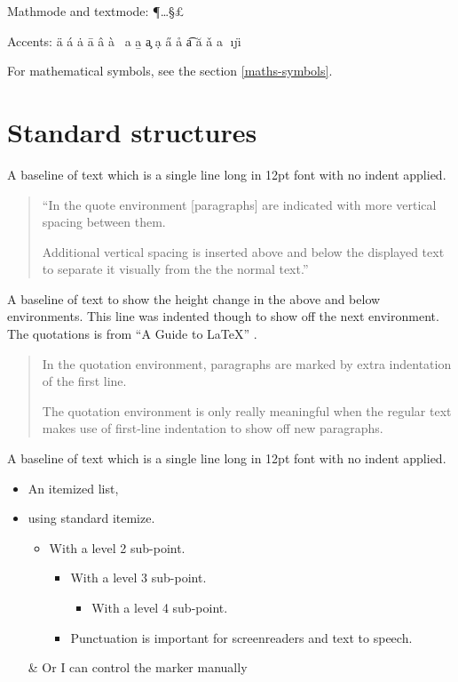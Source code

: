 \documentclass[12pt,a4paper]{article}
\theoremstyle{clearprint}
\begin{document}
\noindent
Mathmode and textmode: \ddag  \P  \dots  \S  \dag  \pounds

\noindent
Accents: \"{a}  \'{a}  \.{a}  \={a}  \^{a}  \`{a}  \  {a}  \b{a}  \c{a}  \d{a}  \H{a}  \r{a}  \t{a}  \u{a}  \v{a}  \textcircled{a}  \i  \j  \"{\i}

\bigskip

For mathematical symbols, see the section \ref{maths-symbols}. 

\newpage

\section[Standard structures]{Standard structures}
\setcounter{equation}{0}

\noindent
A baseline of text which is a single line long in 12pt font with no indent applied.

\begin{quote}
``In the quote environment [paragraphs] are indicated with more vertical spacing between them. 

Additional vertical spacing is inserted above and below the displayed text to separate it visually from the the normal text.''
\end{quote}

A baseline of text to show the height change in the above and below environments. This line was indented though to show off the next environment. The quotations is from ``A Guide to \LaTeX'' \cite{KopkaDaly}.

\begin{quotation}
In the quotation environment, paragraphs are marked by extra indentation of the first line. 

The quotation environment is only really meaningful when the regular text makes use of first-line indentation to show off new paragraphs.
\end{quotation}


\noindent
A baseline of text which is a single line long in 12pt font with no indent applied.

\begin{itemize}
\item An itemized list,
\item using standard itemize.
\begin{itemize}
\item With a level 2 sub-point.
\begin{itemize}
\item With a level 3 sub-point.
\begin{itemize}
\item With a level 4 sub-point.
\end{itemize}
\item Punctuation is important for screenreaders and text to speech.
\end{itemize}
\end{itemize}
\item[\&] Or I can control the marker manually
\end{itemize}
\end{document}
